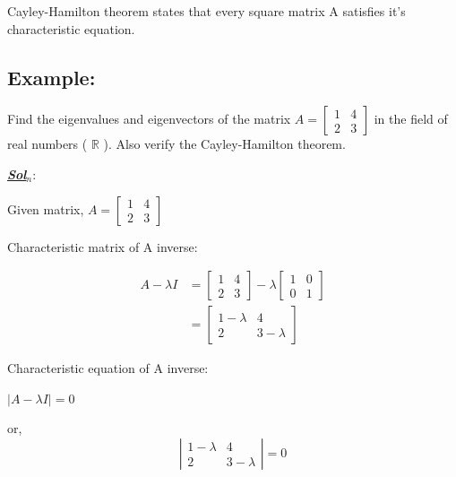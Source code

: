 \documentclass{article}
\begin{document}
    \vspace{10pt}
    Cayley-Hamilton theorem states that every square matrix A satisfies it's characteristic equation.

    \vspace{10pt}
    \subsection*{Example:}
        Find the eigenvalues and eigenvectors of the matrix \( A = \begin{bmatrix} 1 & 4 \\  2 & 3  \end{bmatrix} \) in the field of real numbers ( \( \mathbb{R} \) ). Also verify the Cayley-Hamilton theorem.

    \vspace{20pt}
    \textbf{\underline{\textit{Sol}}$_{\textit{n}}$}:

    \vspace{10pt}
    Given matrix, \(A = \begin{bmatrix} 1 & 4 \\  2 & 3  \end{bmatrix}\)
    
    \vspace{10pt}
    Characteristic matrix of A inverse:

    \[
    \begin{aligned}
        A - \lambda I &= 
        \begin{bmatrix}
            1 & 4 \\
            2 & 3
        \end{bmatrix}
        - \lambda
        \begin{bmatrix}
            1 & 0 \\
            0 & 1
        \end{bmatrix} \\
        &= \begin{bmatrix}
                1-\lambda & 4 \\
                2 & 3-\lambda
            \end{bmatrix}
    \end{aligned}
    \]
    \vspace{20pt}

    Characteristic equation of A inverse:

    \vspace{10pt}
    \(|A - \lambda I| = 0 \)

    or,
    \[
    \left|
    \begin{array}{cc}
        1 - \lambda & 4 \\
        2 & 3 - \lambda
    \end{array}
    \right| = 0
    \]
\end{document}
